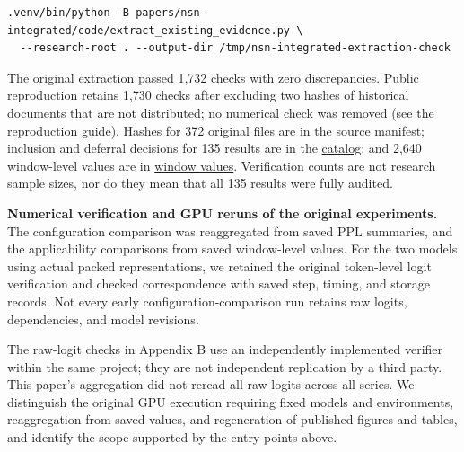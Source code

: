 \documentclass[10pt,a4paper]{article}
\begin{document}
\noindent\begin{minipage}{\linewidth}
\begin{verbatim}
.venv/bin/python -B papers/nsn-integrated/code/extract_existing_evidence.py \
  --research-root . --output-dir /tmp/nsn-integrated-extraction-check
\end{verbatim}
\end{minipage}\par

The original extraction passed 1,732 checks with zero discrepancies. Public reproduction retains 1,730 checks after excluding two hashes of historical documents that are not distributed; no numerical check was removed (see the \href{https://github.com/metaSATOKEN/nsn/blob/c37d39ea0106274d9f661cfbb268b0ed05319846/REPRODUCIBILITY.md}{reproduction guide}). Hashes for 372 original files are in the \href{https://github.com/metaSATOKEN/nsn/blob/c37d39ea0106274d9f661cfbb268b0ed05319846/papers/nsn-integrated/data/extraction-v0.1/source-manifest.json}{source manifest}; inclusion and deferral decisions for 135 results are in the \href{https://github.com/metaSATOKEN/nsn/blob/c37d39ea0106274d9f661cfbb268b0ed05319846/papers/nsn-integrated/data/extraction-v0.1/result-catalog.json}{catalog}; and 2,640 window-level values are in \href{https://github.com/metaSATOKEN/nsn/blob/c37d39ea0106274d9f661cfbb268b0ed05319846/papers/nsn-integrated/data/extraction-v0.1/window-values.json}{window values}. Verification counts are not research sample sizes, nor do they mean that all 135 results were fully audited.

\textbf{Numerical verification and GPU reruns of the original experiments.} The configuration comparison was reaggregated from saved PPL summaries, and the applicability comparisons from saved window-level values. For the two models using actual packed representations, we retained the original token-level logit verification and checked correspondence with saved step, timing, and storage records. Not every early configuration-comparison run retains raw logits, dependencies, and model revisions.

The raw-logit checks in Appendix B use an independently implemented verifier within the same project; they are not independent replication by a third party. This paper's aggregation did not reread all raw logits across all series. We distinguish the original GPU execution requiring fixed models and environments, reaggregation from saved values, and regeneration of published figures and tables, and identify the scope supported by the entry points above.
\end{document}
